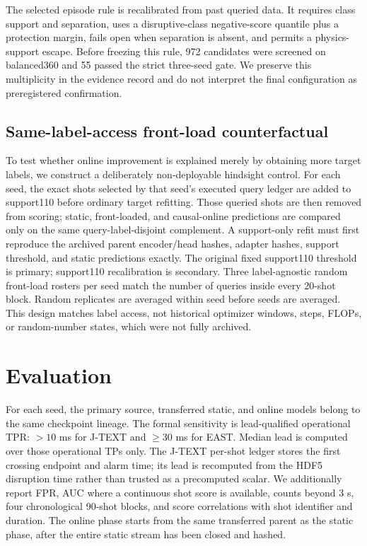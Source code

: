 \documentclass[10pt,twocolumn]{article}
\newcommand{\jtext}{J-TEXT}
\newcommand{\east}{EAST}
\begin{document}
The selected episode rule is recalibrated from past queried data.  It requires class support and separation, uses a disruptive-class negative-score quantile plus a protection margin, fails open when separation is absent, and permits a physics-support escape.  Before freezing this rule, 972 candidates were screened on balanced360 and 55 passed the strict three-seed gate.  We preserve this multiplicity in the evidence record and do not interpret the final configuration as preregistered confirmation.

\subsection{Same-label-access front-load counterfactual}

To test whether online improvement is explained merely by obtaining more target labels, we construct a deliberately non-deployable hindsight control.  For each seed, the exact shots selected by that seed's executed query ledger are added to support110 before ordinary target refitting.  Those queried shots are then removed from scoring; static, front-loaded, and causal-online predictions are compared only on the same query-label-disjoint complement.  A support-only refit must first reproduce the archived parent encoder/head hashes, adapter hashes, support threshold, and static predictions exactly.  The original fixed support110 threshold is primary; support110 recalibration is secondary.  Three label-agnostic random front-load rosters per seed match the number of queries inside every 20-shot block.  Random replicates are averaged within seed before seeds are averaged.  This design matches label access, not historical optimizer windows, steps, FLOPs, or random-number states, which were not fully archived.

\section{Evaluation}

For each seed, the primary source, transferred static, and online models belong to the same checkpoint lineage.  The formal sensitivity is lead-qualified operational TPR: $>10$ ms for \jtext{} and $\geq30$ ms for \east{}.  Median lead is computed over those operational TPs only.  The \jtext{} per-shot ledger stores the first crossing endpoint and alarm time; its lead is recomputed from the HDF5 disruption time rather than trusted as a precomputed scalar.  We additionally report FPR, AUC where a continuous shot score is available, counts beyond 3 s, four chronological 90-shot blocks, and score correlations with shot identifier and duration.  The online phase starts from the same transferred parent as the static phase, after the entire static stream has been closed and hashed.
\end{document}
